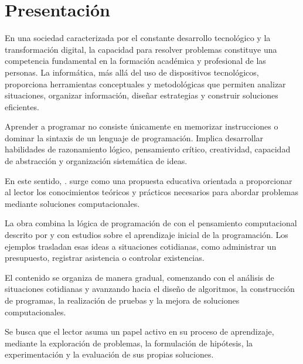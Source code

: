 \chapter{Presentación}

En una sociedad caracterizada por el constante desarrollo tecnológico y la transformación digital, la capacidad para resolver problemas constituye una competencia fundamental en la formación académica y profesional de las personas. La informática, más allá del uso de dispositivos tecnológicos, proporciona herramientas conceptuales y metodológicas que permiten analizar situaciones, organizar información, diseñar estrategias y construir soluciones eficientes.

Aprender a programar no consiste únicamente en memorizar instrucciones o dominar la sintaxis de un lenguaje de programación. Implica desarrollar habilidades de razonamiento lógico, pensamiento crítico, creatividad, capacidad de abstracción y organización sistemática de ideas.

En este sentido, \emph{\TituloLibro. \SubtituloLibro} surge como una propuesta educativa orientada a proporcionar al lector los conocimientos teóricos y prácticos necesarios para abordar problemas mediante soluciones computacionales.

La obra combina la lógica de programación de \textcite{farrell2013} con el pensamiento computacional descrito por \textcite{wing2006} y con estudios sobre el aprendizaje inicial de la programación. Los ejemplos trasladan esas ideas a situaciones cotidianas, como administrar un presupuesto, registrar asistencia o controlar existencias.

El contenido se organiza de manera gradual, comenzando con el análisis de situaciones cotidianas y avanzando hacia el diseño de algoritmos, la construcción de programas, la realización de pruebas y la mejora de soluciones computacionales.

Se busca que el lector asuma un papel activo en su proceso de aprendizaje, mediante la exploración de problemas, la formulación de hipótesis, la experimentación y la evaluación de sus propias soluciones.
